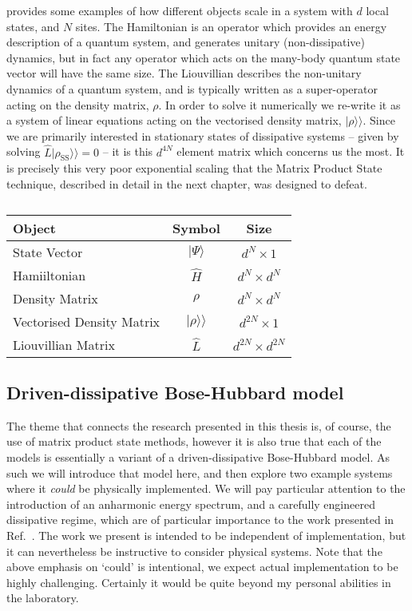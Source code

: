  provides some examples of how different objects scale in a system with \(d\) local states, and \(N\) sites. The Hamiltonian is an operator which provides an energy description of a quantum system, and generates unitary (non-dissipative) dynamics, but in fact any operator which acts on the many-body quantum state vector will have the same size. The Liouvillian describes the non-unitary dynamics of a quantum system, and is typically written as a super-operator acting on the density matrix, \(\rho\). In order to solve it numerically we re-write it as a system of linear equations acting on the vectorised density matrix, \(|\rho\rangle\rangle\). Since we are primarily interested in stationary states of dissipative systems -- given by solving \(\hat{L}|\rho_{\mathrm{SS}}\rangle\rangle = 0\) -- it is this \(d^{4N}\) element matrix which concerns us the most. It is precisely this very poor exponential scaling that the Matrix Product State technique, described in detail in the next chapter, was designed to defeat. 

\begin{table}[ht!]
	\centering
	\begin{tabu}{lcc}
		\hline
		Object & Symbol & Size \\
		\hline
		State Vector & \(|\Psi\rangle\) & \(d^{N} \times 1\) \\
		Hamiiltonian & \(\hat{H}\) & \(d^{N} \times d^{N}\) \\
		Density Matrix & \(\rho\) & \(d^{N} \times d^{N}\) \\
		Vectorised Density Matrix & \(|\rho \rangle\rangle\) & \(d^{2N} \times 1\) \\
		Liouvillian Matrix & \(\hat{L}\) & \(d^{2N} \times d^{2N}\)
	\end{tabu}
	\caption{\label{tab:mbq1-1}}
\end{table}

\FloatBarrier
\subsection{Driven-dissipative Bose-Hubbard model}
The theme that connects the research presented in this thesis is, of course, the use of matrix product state methods, however it is also true that each of the models is essentially a variant of a driven-dissipative Bose-Hubbard model. As such we will introduce that model here, and then explore two example systems where it \emph{could} be physically implemented. We will pay particular attention to the introduction of an anharmonic energy spectrum, and a carefully engineered dissipative regime, which are of particular importance to the work presented in Ref.~\cite{Brown2018}. The work we present is intended to be independent of implementation, but it can nevertheless be instructive to consider physical systems. Note that the above emphasis on `could' is intentional, we expect actual implementation to be highly challenging. Certainly it would be quite beyond my personal abilities in the laboratory.

